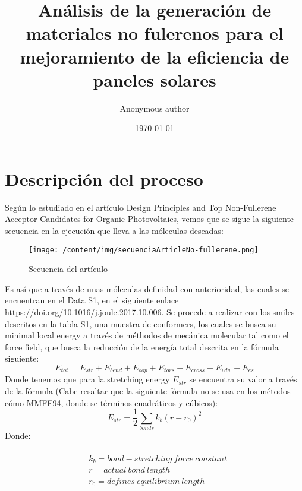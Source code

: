 \documentclass{article}%
\title{Análisis de la generación de materiales no fulerenos para el mejoramiento de la eficiencia de paneles solares}%
\author{Anonymous author}%
\date{\today}%
\begin{document}
%
\normalsize%
\maketitle%
\section{Descripción del proceso}%
\label{sec:Descripcindelproceso}%
Según lo estudiado en el artículo Design Principles and Top Non{-}Fullerene Acceptor Candidates for Organic Photovoltaics, vemos que se sigue la siguiente secuencia en la ejecución que lleva a las móleculas deseadas:%


\begin{figure}[h!]%
\centering%
\texttt{[image: /content/img/secuenciaArticleNo-fullerene.png]}%
\caption{Secuencia del artículo}%
\end{figure}

%
Es así que a través de unas móleculas definidad con anterioridad, las cuales se encuentran en el Data S1, en el siguiente enlace https://doi.org/10.1016/j.joule.2017.10.006. Se procede a realizar con los smiles descritos en la tabla S1, una muestra de conformers, los cuales se busca su minimal local energy a través de méthodos de mecánica molecular tal como el force field, que busca la reducción de la energía total descrita en la fórmula siguiente:%
\begin{equation}
    E_{tot} = E_{str} + E_{bend} + E_{oop} + E_{tors} + E_{cross} + E_{vdw} + E_{es} 
\end{equation}%
Donde tenemos que para la stretching energy $E_{str}$ se encuentra su valor a través de la fórmula (Cabe resaltar que la siguiente fórmula no se usa en los métodos cómo MMFF94, donde se términos cuadráticos y cúbicos):%
\begin{equation}
    E_{str} = \frac{1}{2} \sum_{bonds} k_b(r-r_0)^2%
\end{equation}%
Donde:
\begin{fleqn}
\begin{equation*}
\begin{alignedat}{2}
\\ &k_b = bond-stretching \ force \ constant \\  
&r = actual\ bond\ length \\ 
&r_0 = defines\ equilibrium\ length\\
\end{alignedat}
\end{equation*}
\end{fleqn}%
\end{document}
